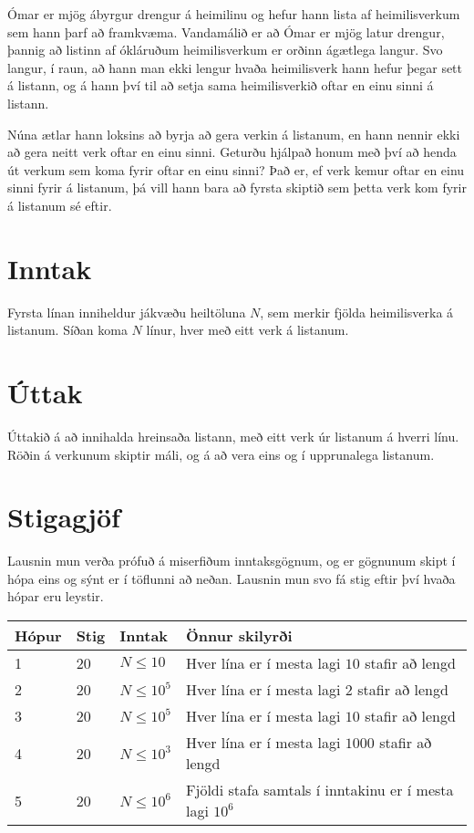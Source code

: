 

Ómar er mjög ábyrgur drengur á heimilinu og hefur hann lista af heimilisverkum
sem hann þarf að framkvæma. Vandamálið er að Ómar er mjög latur drengur, þannig
að listinn af ókláruðum heimilisverkum er orðinn ágætlega langur. Svo langur, í raun,
að hann man ekki lengur hvaða heimilisverk hann hefur þegar sett á listann, og á
hann því til að setja sama heimilisverkið oftar en einu sinni á listann.

Núna ætlar hann loksins að byrja að gera verkin á listanum, en hann nennir ekki
að gera neitt verk oftar en einu sinni. Geturðu hjálpað honum með því að henda
út verkum sem koma fyrir oftar en einu sinni? Það er, ef verk kemur oftar en einu
sinni fyrir á listanum, þá vill hann bara að fyrsta skiptið sem þetta verk kom
fyrir á listanum sé eftir.

\section*{Inntak}
Fyrsta línan inniheldur jákvæðu heiltöluna $N$, sem merkir fjölda heimilisverka
á listanum. Síðan koma $N$ línur, hver með eitt verk á listanum.

\section*{Úttak}
Úttakið á að innihalda hreinsaða listann, með eitt verk úr listanum á hverri línu.
Röðin á verkunum skiptir máli, og á að vera eins og í upprunalega listanum.

\section*{Stigagjöf}
Lausnin mun verða prófuð á miserfiðum inntaksgögnum, og er gögnunum skipt í
hópa eins og sýnt er í töflunni að neðan. Lausnin mun svo fá stig eftir því
hvaða hópar eru leystir.

\begin{tabular}{|l|l|l|l|}
\hline
Hópur & Stig & Inntak & Önnur skilyrði \\ \hline
1     & 20 & $N \leq 10$   & Hver lína er í mesta lagi $10$ stafir að lengd   \\ \hline
2     & 20 & $N \leq 10^5$ & Hver lína er í mesta lagi $2$ stafir að lengd \\ \hline
3     & 20 & $N \leq 10^5$ & Hver lína er í mesta lagi $10$ stafir að lengd  \\ \hline
4     & 20 & $N \leq 10^3$ & Hver lína er í mesta lagi $1000$ stafir að lengd  \\ \hline
5     & 20 & $N \leq 10^6$ & Fjöldi stafa samtals í inntakinu er í mesta lagi $10^6$ \\ \hline
\end{tabular}

